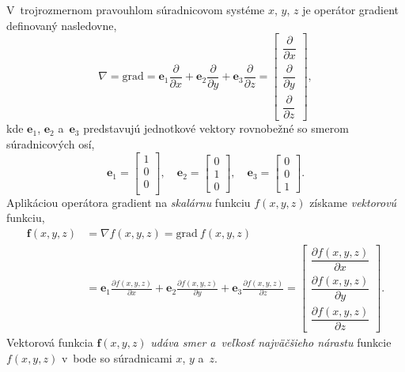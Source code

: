 \documentclass[a4paper,12pt]{book}
\newcommand{\grad}{\mathrm{grad}}
\let\vec\mathbf
\begin{document}
V~trojrozmernom pravouhlom súradnicovom systéme $x$, $y$, $z$ je operátor
gradient definovaný nasledovne,
%
\begin{equation}
\label{eq:gradient}
\nabla = \grad = \vec e_1 \frac{\partial}{\partial x} + \vec e_2
\frac{\partial}{\partial y} + \vec e_3 \frac{\partial}{\partial z} =
\begin{bmatrix}
\dfrac{\partial}{\partial x} \\[2ex]
\dfrac{\partial}{\partial y} \\[2ex]
\dfrac{\partial}{\partial z}
\end{bmatrix}
{,}
\end{equation}
%
kde $\vec e_1$, $\vec e_2$ a~$\vec e_3$ predstavujú jednotkové vektory
rovnobežné so smerom súradnicových osí,
%
\begin{equation}
\label{eq:unit_vectors}
\vec e_1 =
\begin{bmatrix}
1\\
0\\
0\\
\end{bmatrix}
{,} \quad
%
\vec e_2 =
\begin{bmatrix}
0\\
1\\
0
\end{bmatrix}
%
{,}\quad
%
\vec e_3 =
\begin{bmatrix}
0\\
0\\
1
\end{bmatrix}
{.}
\end{equation}
%
Aplikáciou operátora gradient na \emph{skalárnu} funkciu $f(x, y, z)$ získame 
\emph{vektorovú} funkciu,
%
\begin{equation}
\begin{split}
\vec f(x, y, z) &= \nabla f(x, y, z) = \grad \ f(x, y, z)\\
%
&= \vec e_1 \frac{\partial f(x, y, z)}{\partial x} + \vec e_2 \frac{\partial
f(x, y, z)}{\partial y} + \vec e_3 \frac{\partial f(x, y, z)}{\partial z} =
\begin{bmatrix}
\dfrac{\partial f(x, y, z)}{\partial x} \\[2ex]
\dfrac{\partial f(x, y, z)}{\partial y} \\[2ex]
\dfrac{\partial f(x, y, z)}{\partial z}
\end{bmatrix}
{.}
\end{split}
\end{equation}
%
Vektorová funkcia $\vec f(x, y, z)$ \emph{udáva smer a~veľkosť najväčšieho
nárastu} funkcie $f(x, y, z)$ v~bode so súradnicami $x$, $y$ a~$z$.
\end{document}
